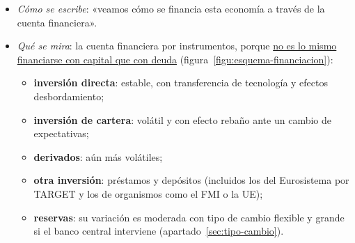 \documentclass[11pt]{article}
\begin{document}
\begin{itemize}
\item \emph{Cómo se escribe}: «veamos cómo se financia esta economía a través de la cuenta financiera».
\item \emph{Qué se mira}: la cuenta financiera por instrumentos, porque \uline{no es lo mismo financiarse con capital que con deuda} (figura~\ref{figu:esquema-financiacion}):
  \begin{itemize}
  \item \textbf{inversión directa}: estable, con transferencia de tecnología y efectos desbordamiento;
  \item \textbf{inversión de cartera}: volátil y con efecto rebaño ante un cambio de expectativas;
  \item \textbf{derivados}: aún más volátiles;
  \item \textbf{otra inversión}: préstamos y depósitos (incluidos los del Eurosistema por TARGET y los de organismos como el FMI o la UE);
  \item \textbf{reservas}: su variación es moderada con tipo de cambio flexible y grande si el banco central interviene (apartado~\ref{sec:tipo-cambio}).
  \end{itemize}
\end{itemize}

\begin{infografia}[!htb]
\centering
\caption{La cuenta financiera por instrumentos y la adecuación de las reservas}\label{figu:esquema-financiacion}
\end{infografia}
\end{document}
